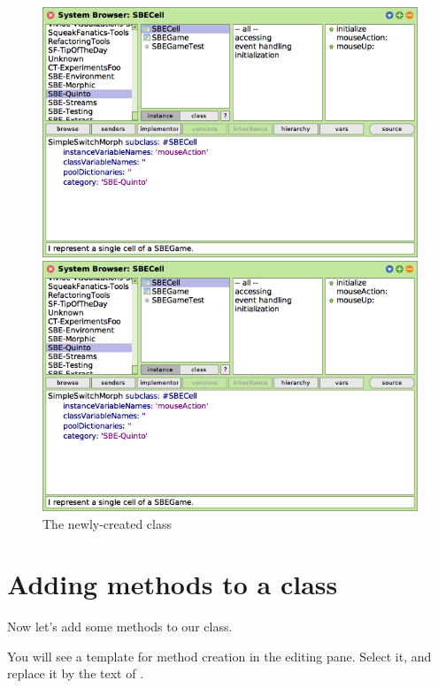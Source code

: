 \documentclass[a4paper,10pt,twoside]{book}
\begin{document}
\begin{figure}[h!t]
\ifluluelse
	{\centerline {\includegraphics[width=\textwidth]{SBECell}}}
	{\centerline {\includegraphics[scale=0.7]{SBECell}}}
\caption{The newly-created class \label{fig:SBECell}}
\end{figure}

\section{Adding methods to a class}

Now let's add some methods to our class.

You will see a template for method creation in the editing pane.
Select it, and replace it by the text of .
\end{document}
